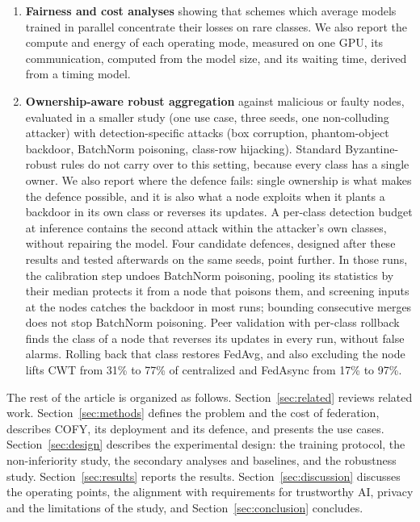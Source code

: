 \documentclass[pdflatex,sn-mathphys-num]{sn-jnl}
\newcommand{\sys}{COFY}
\begin{document}
\begin{enumerate}
\item \textbf{Fairness and cost analyses} showing that schemes which average models trained in parallel concentrate their losses on rare classes. We also report the compute and energy of each operating mode, measured on one GPU, its communication, computed from the model size, and its waiting time, derived from a timing model.
\item \textbf{Ownership-aware robust aggregation} against malicious or faulty nodes, evaluated in a smaller study (one use case, three seeds, one non-colluding attacker) with detection-specific attacks (box corruption, phantom-object backdoor, BatchNorm poisoning, class-row hijacking). Standard Byzantine-robust rules do not carry over to this setting, because every class has a single owner. We also report where the defence fails: single ownership is what makes the defence possible, and it is also what a node exploits when it plants a backdoor in its own class or reverses its updates. A per-class detection budget at inference contains the second attack within the attacker's own classes, without repairing the model. Four candidate defences, designed after these results and tested afterwards on the same seeds, point further. In those runs, the calibration step undoes BatchNorm poisoning, pooling its statistics by their median protects it from a node that poisons them, and screening inputs at the nodes catches the backdoor in most runs; bounding consecutive merges does not stop BatchNorm poisoning. Peer validation with per-class rollback finds the class of a node that reverses its updates in every run, without false alarms. Rolling back that class restores FedAvg, and also excluding the node lifts CWT from 31\% to 77\% of centralized and FedAsync from 17\% to 97\%.
\end{enumerate}

The rest of the article is organized as follows. Section~\ref{sec:related} reviews related work. Section~\ref{sec:methods} defines the problem and the cost of federation, describes \sys{}, its deployment and its defence, and presents the use cases. Section~\ref{sec:design} describes the experimental design: the training protocol, the non-inferiority study, the secondary analyses and baselines, and the robustness study. Section~\ref{sec:results} reports the results. Section~\ref{sec:discussion} discusses the operating points, the alignment with requirements for trustworthy AI, privacy and the limitations of the study, and Section~\ref{sec:conclusion} concludes.
\end{document}
